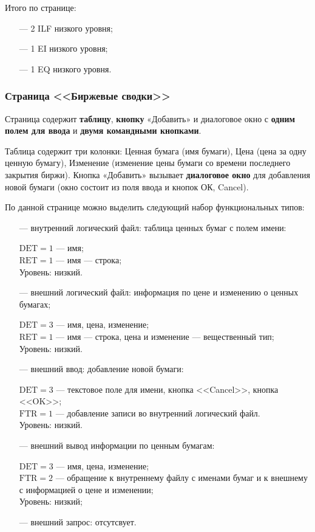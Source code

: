 Итого по странице:

\begin{itemize}
    \item[---] 2 ILF низкого уровня;
    \item[---] 1 EI низкого уровня;
    \item[---] 1 EQ низкого уровня.
\end{itemize}

\subsubsection*{Страница <<Биржевые сводки>>}

Страница содержит \textbf{таблицу}, \textbf{кнопку} «Добавить» и диалоговое окно с \textbf{одним полем для ввода} и \textbf{двумя командными кнопками}.

Таблица содержит три колонки: Ценная бумага (имя бумаги), Цена (цена за одну ценную бумагу), Изменение (изменение цены бумаги со времени последнего закрытия биржи). Кнопка «Добавить» вызывает \textbf{диалоговое окно} для добавления новой бумаги (окно состоит из поля ввода и кнопок ОК, Cancel).

По данной странице можно выделить следующий набор функциональных типов:

\begin{itemize}
    \item[---] внутренний логический файл: таблица ценных бумаг с полем имени:
    
        $\text{DET} = 1$ --- имя;\\
        $\text{RET} = 1$ --- имя --- строка;\\
        Уровень: низкий.
        
    \item[---] внешний логический файл: информация по цене и изменению о ценных бумагах;

        $\text{DET} = 3$ --- имя, цена, изменение;\\
        $\text{RET} = 1$ --- имя --- строка, цена и изменение --- вещественный тип;\\
        Уровень: низкий.
        
    \item[---] внешний ввод: добавление новой бумаги:
    
        $\text{DET} = 3$ --- текстовое поле для имени, кнопка <<Cancel>>, кнопка <<OK>>; \\
        $\text{FTR} = 1$ --- добавление записи во внутренний логический файл.\\
        Уровень: низкий.
        
    \item[---] внешний вывод информации по ценным бумагам:
    
        $\text{DET} = 3$ --- имя, цена, изменение; \\
        $\text{FTR} = 2$ --- обращение к внутреннему файлу с именами бумаг и к внешнему с информацией о цене и изменении;\\
        Уровень: низкий;
        
    \item[---] внешний запрос: отсутсвует.
\end{itemize}

